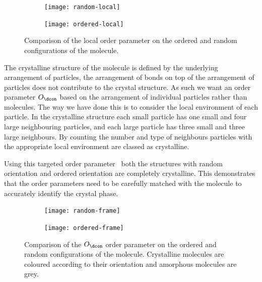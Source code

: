 \begin{figure}
    \begin{subfigure}[t]{0.5\linewidth}
        \texttt{[image: random-local]}
        \caption{}
        \label{fig:random local}
    \end{subfigure}
    \begin{subfigure}[t]{0.5\linewidth}
        \texttt{[image: ordered-local]}
        \caption{}
        \label{fig:orderd local}
    \end{subfigure}
    \caption{Comparison of the local order parameter on the ordered  and random  configurations of the \dcon molecule.}
    \label{fig:compact local}
\end{figure}

The crystalline structure of the \dcon molecule is defined by the underlying arrangement of particles, the arrangement of bonds on top of the arrangement of particles does not contribute to the crystal structure. As such we want an order parameter $O_\dcon$ based on the arrangement of individual particles rather than molecules. The way we have done this is to consider the local environment of each particle. In the crystalline structure each small particle has one small and four large neighbouring particles, and each large particle has three small and three large neighbours. By counting the number and type of neighbours particles with the appropriate local environment are classed as crystalline.

Using this targeted order parameter~ both the structures with random orientation and ordered orientation are completely crystalline. This demonstrates that the order parameters need to be carefully matched with the molecule to accurately identify the crystal phase.

\begin{figure}
    \begin{subfigure}[t]{0.5\linewidth}
        \texttt{[image: random-frame]}
        \caption{}
        \label{fig:random frame}
    \end{subfigure}
    \begin{subfigure}[t]{0.5\linewidth}
        \texttt{[image: ordered-frame]}
        \caption{}
        \label{fig:orderd frame}
    \end{subfigure}
    \caption{Comparison of the $O_\dcon$ order parameter on the ordered  and random  configurations of the \dcon molecule. Crystalline molecules are coloured according to their orientation and amorphous molecules are grey.}
    \label{fig:compact local}
\end{figure}

